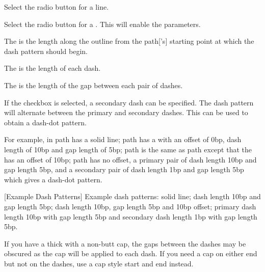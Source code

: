 
Select the  radio button for a 
 line.


Select the  radio button for a
. This will enable the 
parameters.


The  is the length along the outline from the
\gls{path}['s] starting point at which the dash pattern should begin.


The  is the length of each dash.


The  is the length of the gap between
each pair of dashes.


If the  checkbox is selected, 
a secondary dash can be specified. The dash pattern will alternate
between the primary and secondary dashes. This can be used to obtain
a dash-dot pattern.

For example, in  path  has a
solid line; path  has a  with
an offset of 0\gls{bp}, dash length of 10\gls{bp} and gap length of
5\gls{bp}; path  is the same as path
 except that the  has an
offset of 10\gls{bp}; path  has no offset, a primary
pair of dash length 10\gls{bp} and gap length 5\gls{bp}, and a
secondary pair of dash length 1\gls{bp} and gap length 5\gls{bp}
which gives a dash-dot pattern.

{}
[Example Dash Patterns]
{Example dash patterns: 
solid line;  dash length 10bp and gap length 5bp;
 dash length 10bp, gap length 5bp and 10bp offset;
 primary dash length 10bp with gap length 5bp and
secondary dash length 1bp with gap length 5bp.}

\begin{information}
If you have a thick  with a non-butt cap, the
gaps between the dashes may be obscured as the cap will be applied
to each dash. If you need a cap on either end but not on the dashes,
use a cap style start and end  instead.
\end{information}


